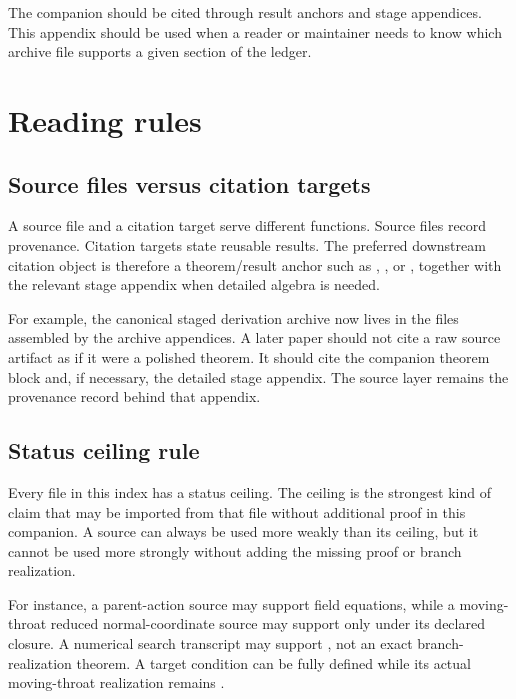 The companion should be cited through result anchors and stage appendices.  This appendix should be used when a reader or maintainer needs to know which archive file supports a given section of the ledger.

\section{Reading rules}
\label{sec:source-index-reading-rules}

\subsection{Source files versus citation targets}
\label{subsec:source-files-vs-citation-targets}

A source file and a citation target serve different functions.  Source files record provenance.  Citation targets state reusable results.  The preferred downstream citation object is therefore a theorem/result anchor such as , , or , together with the relevant stage appendix when detailed algebra is needed.

For example, the canonical staged derivation archive now lives in the
 files assembled by the archive appendices.
A later paper should not cite a raw source artifact as if it were a polished
theorem.  It should cite the companion theorem block and, if necessary, the
detailed stage appendix.  The source layer remains the provenance record behind
that appendix.

\subsection{Status ceiling rule}
\label{subsec:source-status-ceiling-rule}

Every file in this index has a status ceiling.  The ceiling is the strongest kind of claim that may be imported from that file without additional proof in this companion.  A source can always be used more weakly than its ceiling, but it cannot be used more strongly without adding the missing proof or branch realization.

For instance, a parent-action source may support \StatusExact{} field equations, while a moving-throat reduced normal-coordinate source may support only \StatusExactClosure{} under its declared closure.  A numerical search transcript may support \StatusNumerical{}, not an exact branch-realization theorem.  A target condition can be fully defined while its actual moving-throat realization remains \StatusOpen{}.

